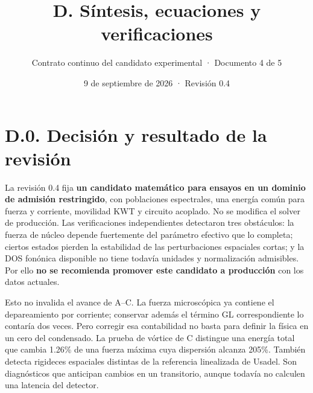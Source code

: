 \documentclass[
  spanish,
  10pt,
  a4paper,
]{article}
\title{D. Síntesis, ecuaciones y verificaciones}
\subtitle{Contrato continuo del candidato experimental · Documento 4 de
5}
\author{}
\date{9 de septiembre de 2026 · Revisión 0.4}
\begin{document}
\maketitle

{
\setcounter{tocdepth}{2}
\tableofcontents
}
\newpage

\section{D.0. Decisión y resultado de la
revisión}\label{d.0.-decisiuxf3n-y-resultado-de-la-revisiuxf3n}

La revisión 0.4 fija \textbf{un candidato matemático para ensayos en un
dominio de admisión restringido}, con poblaciones espectrales, una
energía común para fuerza y corriente, movilidad KWT y circuito
acoplado. No se modifica el solver de producción. Las verificaciones
independientes detectaron tres obstáculos: la fuerza de núcleo depende
fuertemente del parámetro efectivo que lo completa; ciertos estados
pierden la estabilidad de las perturbaciones espaciales cortas; y la DOS
fonónica disponible no tiene todavía unidades y normalización
admisibles. Por ello \textbf{no se recomienda promover este candidato a
producción} con los datos actuales.

Esto no invalida el avance de A--C. La fuerza microscópica ya contiene
el depareamiento por corriente; conservar además el término GL
correspondiente lo contaría dos veces. Pero corregir esa contabilidad no
basta para definir la física en un cero del condensado. La prueba de
vórtice de C distingue una energía total que cambia 1.26\% de una fuerza
máxima cuya dispersión alcanza 205\%. También detecta rigideces
espaciales distintas de la referencia linealizada de Usadel. Son
diagnósticos que anticipan cambios en un transitorio, aunque todavía no
calculen una latencia del detector.
\end{document}
